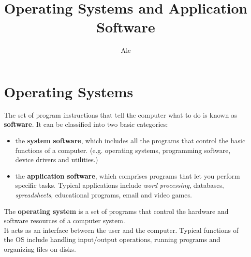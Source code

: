 \documentclass[a4paper,8pt]{article}
\begin{document}
\title{Operating Systems and Application Software}
\author{Ale}
\maketitle
\section{Operating Systems}
The set of program instructions that tell the computer what to do is known as
\textbf{software}. It can be classified into two basic categories:
\begin{itemize}
\item the \textbf{system software}, which includes all the programs that control
  the basic functions of a computer. (e.g. operating systems, programming 
  software, device drivers and utilities.)
\item the \textbf{application software}, which comprises programs that let you
  perform specific tasks. Typical applications include \textsl{word processing},
  databases, \textsl{spreadsheets}, educational programs, email 
  and video games.
\end{itemize}
The \textbf{operating system} is a set of programs that control the hardware and
software resources of a computer system.\\
It acts as an interface between the user and the computer.
Typical functions of the OS include handling input/output operations, 
running programs and organizing files on disks.
\end{document}
